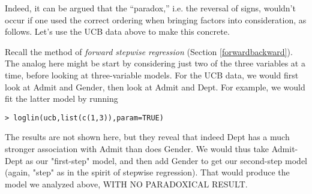 Indeed, it can be argued that the ``paradox,'' i.e. the reversal of
signs, wouldn't occur if one used the correct ordering when bringing
factors into consideration, as follows.  Let's use the UCB data above to
make this concrete.

Recall the method of {\it forward stepwise regression} (Section
\ref{forwardbackward}).  The analog here might be start by considering
just two of the three variables at a time, before looking at
three-variable models.  For the UCB data, we would first look at Admit and
Gender, then look at Admit and Dept.  For example, we would fit the
latter model by running

\begin{lstlisting}
> loglin(ucb,list(c(1,3)),param=TRUE)
\end{lstlisting}

The results are not shown here, but they reveal that indeed Dept has a
much stronger association with Admit than does Gender.  We would thus
take Admit-Dept as our "first-step" model, and then add Gender to get
our second-step model (again, "step" as in the spirit of stepwise
regression).  That would produce the model we analyzed above, WITH
NO PARADOXICAL RESULT.


% 
% 
% 
% 
% 
% 
% 
% 
% 
% 
% 
% 
% 
% 
% 
% 
% 
% 
% 
% 
% 
% 


